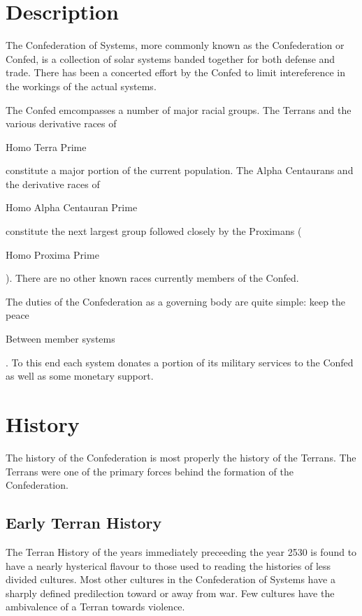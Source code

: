 
\section{Description}
The Confederation of Systems, more commonly known as the 
Confederation or Confed, is a collection of solar systems banded 
together for both defense and trade. There has been a concerted 
effort by the Confed to limit intereference in the workings of the 
actual systems.

The Confed emcompasses a number of major racial groups. The Terrans 
and the various derivative races of \begin{em} Homo Terra Prime \end{em}
constitute a major portion of the current population. The Alpha 
Centaurans and the derivative races of \begin{em} Homo Alpha Centauran 
Prime \end{em} constitute the next largest group followed closely by the 
Proximans (\begin{em} Homo Proxima Prime \end{em}). There are no other known races 
currently members of the Confed.

The duties of the Confederation as a governing body are quite simple: 
keep the peace \begin{em} Between member systems \end{em}. To this end each system 
donates a portion of its military services to the Confed as well as 
some monetary support.

\section{History}

The history of the Confederation is most properly the history of the 
Terrans. The Terrans were one of the primary forces behind the 
formation of the Confederation. 

\subsection{Early Terran History}

The Terran History of the years immediately preceeding the year 2530 is
found to have a nearly hysterical flavour to those used to reading the
histories of less divided cultures. Most other cultures in the 
Confederation of Systems have a sharply defined predilection toward or
away from war. Few cultures have the ambivalence of a Terran towards
violence.

